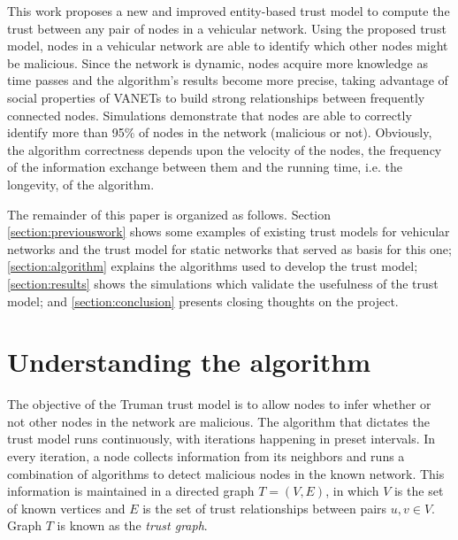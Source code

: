 \documentclass[conference]{IEEEtran}
\begin{document}
This work proposes a new and improved entity-based trust model to compute the trust between any pair of nodes in a vehicular network.
Using the proposed trust model, nodes in a vehicular network are able to identify which other nodes might be malicious.
Since the network is dynamic, nodes acquire more knowledge as time passes and the algorithm's results become more precise, taking advantage of social properties of VANETs \cite{da2013effective} \cite{cunha2014possible} to build strong relationships between frequently connected nodes.
Simulations demonstrate that nodes are able to correctly identify more than 95\% of nodes in the network (malicious or not). Obviously, the algorithm correctness depends upon the velocity of the nodes, the frequency of the information exchange between them and the running time, i.e. the longevity, of the algorithm.


The remainder of this paper is organized as follows.
Section \ref{section:previouswork} shows some examples of existing trust models for vehicular networks and the trust model for static networks that served as basis for this one;
\autoref{section:algorithm} explains the algorithms used to develop the trust model;
\autoref{section:results} shows the simulations which validate the usefulness of the trust model;
and \autoref{section:conclusion} presents closing thoughts on the project.

\section{Understanding the algorithm}
\label{section:algorithm}


The objective of the Truman trust model is to allow nodes to infer whether or not other nodes in the network are malicious.
The algorithm that dictates the trust model runs continuously, with iterations happening in preset intervals.
In every iteration, a node collects information from its neighbors and runs a combination of algorithms to detect malicious nodes in the known network.
This information is maintained in a directed graph $T=(V,E)$, in which $V$ is the set of known vertices and $E$ is the set of trust relationships between pairs $u,v \in V$.
Graph $T$ is known as the \textit{trust graph}.
\end{document}
